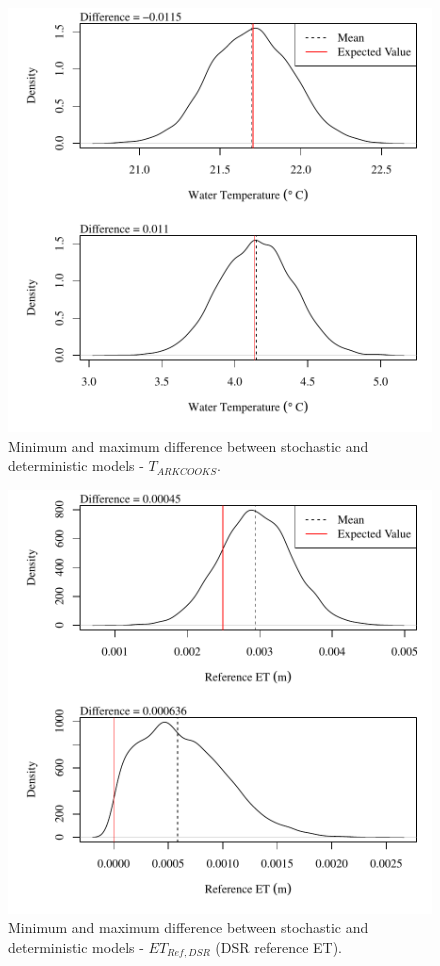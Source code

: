 \begin{center}
\begin{figure}[htbp]
	\includegraphics[width=6in]{"Figures/Results_DSR/V min-max diff tout"}
	\caption{Minimum and maximum difference between stochastic and deterministic models - $T_{ARKCOOKS}$.}
\end{figure}
\end{center}
\newpage

\begin{center}
\begin{figure}[htbp]
	\includegraphics[width=6in]{"Figures/Results_DSR/V min-max diff et"}
	\caption{Minimum and maximum difference between stochastic and deterministic models - $ET_{Ref,DSR}$ (DSR reference ET).}
\end{figure}
\end{center}
\newpage

